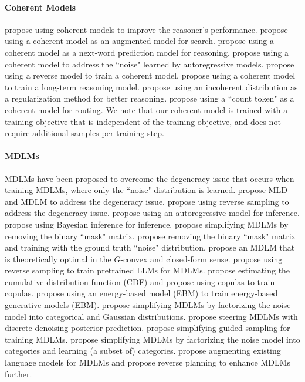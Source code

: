 \paragraph{Coherent Models}
\citet{kitouni2024factorization,kim2024task,chen2024premise,lehnert2024beyond} propose using coherent models to improve the reasoner's performance. \citet{kim2024task,lehnert2024beyond} propose using a coherent model as an augmented model for search. \citet{chen2024premise} propose using a coherent model as a next-word prediction model for reasoning. \citet{kitouni2024factorization} propose using a coherent model to address the ``noise" learned by autoregressive models. \citet{golovneva2024reverse, shah2024causal} propose using a reverse model to train a coherent model. \citet{chen2024reverse} propose using a coherent model to train a long-term reasoning model. \citet{shi2025simplified} propose using an incoherent distribution as a regularization method for better reasoning. \citet{chuang2024learning} propose using a ``count token" as a coherent model for routing. We note that our coherent model is trained with a training objective that is independent of the training objective, and does not require additional samples per training step. 

\paragraph{MDLMs}
MDLMs have been proposed to overcome the degeneracy issue that occurs when training MDLMs, where only the ``noise" distribution is learned. \citet{austin2023structured} propose MLD and MDLM to address the degeneracy issue. \citet{shih2022training} propose using reverse sampling to address the degeneracy issue. \citet{zheng2024maskeddiffusionmodelssecretly,NEURIPS2024_c153077e} propose using an autoregressive model for inference. \citet{varma2024glauber} propose using Bayesian inference for inference. \citet{shi2025simplified} propose simplifying MDLMs by removing the binary ``mask" matrix. \citet{kitouni2024factorization} propose removing the binary ``mask" matrix and training with the ground truth ``noise" distribution. \citet{zheng2024reparameterized} propose an MDLM that is theoretically optimal in the $G$-convex and closed-form sense. \citet{touvron2023llama2} propose using reverse sampling to train pretrained LLMs for MDLMs. \citet{lou2024discrete} propose estimating the cumulative distribution function (CDF) and \citet{liu2024copula} propose using copulas to train copulas. \citet{xu2024energy} propose using an energy-based model (EBM) to train energy-based generative models (EBM). \citet{shipahi2025simplified} propose simplifying MDLMs by factorizing the noise model into categorical and Gaussian distributions.  \citet{rectorbrooks2024steering} propose steering MDLMs with discrete denoising posterior prediction. \citet{schiff2024simple} propose simplifying guided sampling for training MDLMs. \citet{sahoo2024simple} propose simplifying MDLMs by factorizing the noise model into categories and learning (a subset of) categories. \citet{ye2024beyond} propose augmenting existing language models for MDLMs and propose reverse planning to enhance MDLMs further. 


